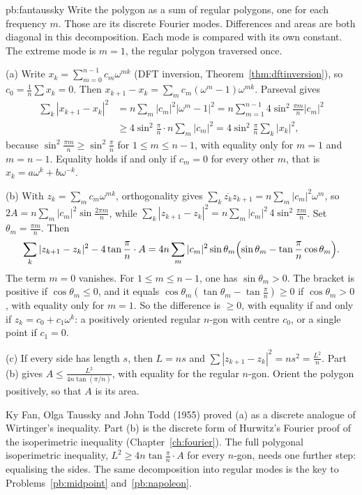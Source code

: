 \begin{solution}{pb:fantaussky}
\idea Write the polygon as a sum of regular polygons, one for each frequency $m$. Those are its discrete Fourier modes. Differences and areas
are both diagonal in this decomposition. Each mode is compared with its own constant. The extreme mode is $m=1$, the regular
polygon traversed once.

\writeup (a) Write $x_k=\sum_{m=0}^{n-1}c_m\omega^{mk}$ (DFT inversion, Theorem~\ref{thm:dftinversion}), so $c_0=\frac1n\sum x_k=0$. Then $x_{k+1}-x_k=\sum_mc_m(\omega^m-1)\omega^{mk}$. Parseval gives
\[
\begin{aligned}\sum_k|x_{k+1}-x_k|^2&=n\sum_m|c_m|^2|\omega^m-1|^2=n\sum_{m=1}^{n-1}4\sin^2\frac{\pi m}n|c_m|^2\\&\ge4\sin^2\frac\pi n\cdot n\sum_m|c_m|^2=4\sin^2\frac\pi n\sum_k|x_k|^2,\end{aligned}
\]
because $\sin^2\frac{\pi m}n\ge\sin^2\frac\pi n$ for $1\le m\le n-1$, with equality only for $m=1$ and $m=n-1$. Equality holds if and only if $c_m=0$ for every other $m$, that is
$x_k=a\omega^k+b\omega^{-k}$.

(b) With $z_k=\sum_mc_m\omega^{mk}$, orthogonality gives $\sum_k\overline{z_k}z_{k+1}=n\sum_m|c_m|^2\omega^m$, so $2A=n\sum_m|c_m|^2\sin\frac{2\pi m}n$, while
$\sum_k|z_{k+1}-z_k|^2=n\sum_m|c_m|^2\,4\sin^2\frac{\pi m}n$. Set $\theta_m=\frac{\pi m}n$. Then
\[
\sum_k|z_{k+1}-z_k|^2-4\tan\frac\pi n\cdot A=4n\sum_m|c_m|^2\sin\theta_m\Bigl(\sin\theta_m-\tan\frac\pi n\cos\theta_m\Bigr).
\]
The term $m=0$ vanishes. For $1\le m\le n-1$, one has $\sin\theta_m>0$. The bracket is positive if $\cos\theta_m\le0$, and it equals $\cos\theta_m(\tan\theta_m-\tan\frac\pi n)\ge0$ if
$\cos\theta_m>0$, with equality only for $m=1$. So the difference is $\ge0$, with equality if and only if $z_k=c_0+c_1\omega^k$: a positively oriented regular $n$-gon
with centre $c_0$, or a single point if $c_1=0$.

(c) If every side has length $s$, then $L=ns$ and $\sum|z_{k+1}-z_k|^2=ns^2=\frac{L^2}n$. Part (b) gives $A\le\frac{L^2}{4n\tan(\pi/n)}$, with equality for the regular
$n$-gon. Orient the polygon positively, so that $A$ is its area.

\leads Ky Fan, Olga Taussky and John Todd (1955) proved (a) as a discrete analogue of Wirtinger's inequality. Part (b) is the discrete
form of Hurwitz's Fourier proof of the isoperimetric inequality (Chapter~\ref{ch:fourier}). The full polygonal isoperimetric inequality,
$L^2\ge4n\tan\frac\pi n\cdot A$ for every $n$-gon, needs one further step: equalising the sides. The same decomposition into regular
modes is the key to Problems~\ref{pb:midpoint} and~\ref{pb:napoleon}.
\end{solution}

